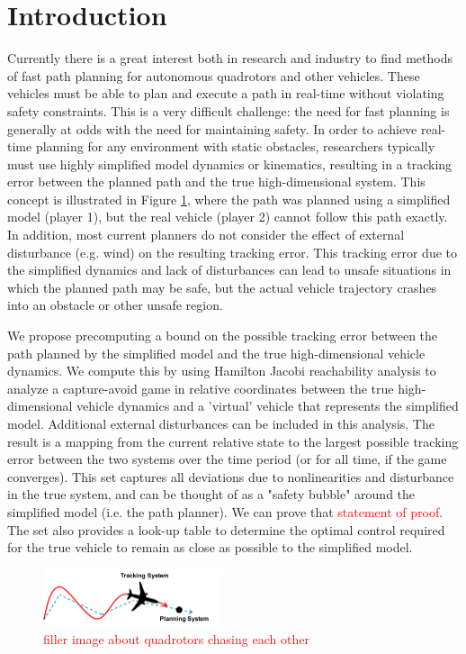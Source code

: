 \section{Introduction}
 Currently there is a great interest both in research and industry to find methods of fast path planning for autonomous quadrotors and other vehicles. These vehicles must be able to plan and execute a path in real-time without violating safety constraints. This is a very difficult challenge: the need for fast planning is generally at odds with the need for maintaining safety. In order to achieve real-time planning for any environment with static obstacles, researchers typically must use highly simplified model dynamics or kinematics, resulting in a tracking error between the planned path and the true high-dimensional system. This concept is illustrated in Figure \ref{fig:chasing}, where the path was planned using a simplified model (player 1), but the real vehicle (player 2) cannot follow this path exactly. In addition, most current planners do not consider the effect of external disturbance (e.g. wind) on the resulting tracking error. This tracking error due to the simplified dynamics and lack of disturbances can lead to unsafe situations in which the planned path may be safe, but the actual vehicle trajectory crashes into an obstacle or other unsafe region.

We propose precomputing a bound on the possible tracking error between the path planned by the simplified model and the true high-dimensional vehicle dynamics. We compute this by using Hamilton Jacobi reachability analysis to analyze a capture-avoid game in relative coordinates between the true high-dimensional vehicle dynamics and a 'virtual' vehicle that represents the simplified model. Additional external disturbances can be included in this analysis. The result is a mapping from the current relative state to the largest possible tracking error between the two systems over the time period (or for all time, if the game converges). This set captures all deviations due to nonlinearities and disturbance in the true system, and can be thought of as a "safety bubble" around the simplified model (i.e. the path planner). We can prove that \textcolor{red}{statement of proof}. The set also provides a look-up table to determine the optimal control required for the true vehicle to remain as close as possible to the simplified model.

\begin{figure}
	\centering
	\includegraphics[width=0.47\textwidth]{fig/chasing}
	\caption{\textcolor{red}{filler image about quadrotors chasing each other}}
	\label{fig:chasing}
\end{figure}

